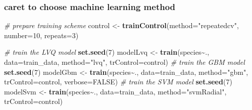 \documentclass[
]{article}
\newenvironment{Shaded}{\begin{snugshade}}{\end{snugshade}}
\newcommand{\AttributeTok}[1]{\textcolor[rgb]{0.13,0.29,0.53}{#1}}
\newcommand{\CommentTok}[1]{\textcolor[rgb]{0.56,0.35,0.01}{\textit{#1}}}
\newcommand{\ConstantTok}[1]{\textcolor[rgb]{0.56,0.35,0.01}{#1}}
\newcommand{\DecValTok}[1]{\textcolor[rgb]{0.00,0.00,0.81}{#1}}
\newcommand{\FloatTok}[1]{\textcolor[rgb]{0.00,0.00,0.81}{#1}}
\newcommand{\FunctionTok}[1]{\textcolor[rgb]{0.13,0.29,0.53}{\textbf{#1}}}
\newcommand{\NormalTok}[1]{#1}
\newcommand{\OtherTok}[1]{\textcolor[rgb]{0.56,0.35,0.01}{#1}}
\newcommand{\SpecialCharTok}[1]{\textcolor[rgb]{0.81,0.36,0.00}{\textbf{#1}}}
\newcommand{\StringTok}[1]{\textcolor[rgb]{0.31,0.60,0.02}{#1}}
\begin{document}
\hypertarget{caret-to-choose-machine-learning-method}{%
\subsubsection{caret to choose machine learning method}\label{caret-to-choose-machine-learning-method}}

\begin{Shaded}
\end{Shaded}

\begin{Shaded}
\begin{Highlighting}[]
\CommentTok{\# prepare training scheme}
\NormalTok{control }\OtherTok{\textless{}{-}} \FunctionTok{trainControl}\NormalTok{(}\AttributeTok{method=}\StringTok{"repeatedcv"}\NormalTok{, }\AttributeTok{number=}\DecValTok{10}\NormalTok{, }\AttributeTok{repeats=}\DecValTok{3}\NormalTok{)}
\end{Highlighting}
\end{Shaded}

\begin{Shaded}
\begin{Highlighting}[]
\CommentTok{\# train the LVQ model}
\FunctionTok{set.seed}\NormalTok{(}\DecValTok{7}\NormalTok{)}
\NormalTok{modelLvq }\OtherTok{\textless{}{-}} \FunctionTok{train}\NormalTok{(species}\SpecialCharTok{\textasciitilde{}}\NormalTok{., }\AttributeTok{data=}\NormalTok{train\_data, }\AttributeTok{method=}\StringTok{"lvq"}\NormalTok{, }\AttributeTok{trControl=}\NormalTok{control)}
\CommentTok{\# train the GBM model}
\FunctionTok{set.seed}\NormalTok{(}\DecValTok{7}\NormalTok{)}
\NormalTok{modelGbm }\OtherTok{\textless{}{-}} \FunctionTok{train}\NormalTok{(species}\SpecialCharTok{\textasciitilde{}}\NormalTok{., }\AttributeTok{data=}\NormalTok{train\_data, }\AttributeTok{method=}\StringTok{"gbm"}\NormalTok{, }\AttributeTok{trControl=}\NormalTok{control, }\AttributeTok{verbose=}\ConstantTok{FALSE}\NormalTok{)}
\CommentTok{\# train the SVM model}
\FunctionTok{set.seed}\NormalTok{(}\DecValTok{7}\NormalTok{)}
\NormalTok{modelSvm }\OtherTok{\textless{}{-}} \FunctionTok{train}\NormalTok{(species}\SpecialCharTok{\textasciitilde{}}\NormalTok{., }\AttributeTok{data=}\NormalTok{train\_data, }\AttributeTok{method=}\StringTok{"svmRadial"}\NormalTok{, }\AttributeTok{trControl=}\NormalTok{control)}
\end{Highlighting}
\end{Shaded}
\end{document}
